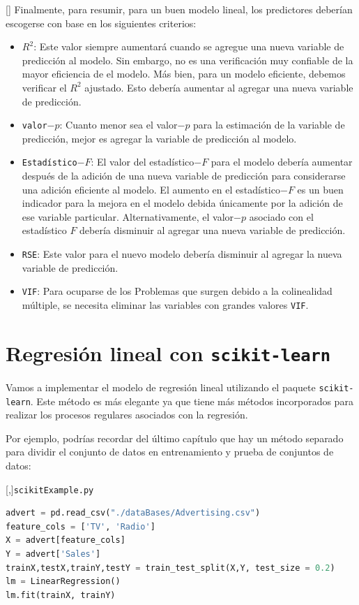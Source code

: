 []{}
Finalmente, para resumir, para un buen modelo lineal, los predictores deberían escogerse con base en los siguientes criterios:
\begin{itemize}
 \item \texttt{$R^2$}: Este valor siempre aumentará cuando se agregue una nueva variable de predicción al
modelo. Sin embargo, no es una verificación muy confiable de la mayor eficiencia de
el modelo. Más bien, para un modelo eficiente, debemos verificar el $R^2$ ajustado.
Esto debería aumentar al agregar una nueva variable de predicción.
\item \texttt{valor$-p$}: Cuanto menor sea el valor$-p$ para la estimación de la variable de predicción,
mejor es agregar la variable de predicción al modelo.
\item \texttt{Estadístico$-F$}: El valor del estadístico$-F$ para el modelo debería aumentar después de
la adición de una nueva variable de predicción para considerarse una
adición eficiente al modelo. El aumento en el estadístico$-F$ es un buen indicador para la mejora en el modelo debida únicamente por la adición de ese variable particular. Alternativamente, el valor$-p$ asociado con el estadístico $F$ debería disminuir al agregar una nueva variable de predicción. 
\item \texttt{RSE}: Este valor para el nuevo modelo debería disminuir al agregar
la nueva variable de predicción.
\item \texttt{VIF}: Para ocuparse de los Problemas que surgen debido a la colinealidad múltiple, se necesita
eliminar las variables con grandes valores \texttt{VIF}.
\end{itemize}


\section{Regresión lineal con \texttt{scikit-learn}}

Vamos a implementar el modelo de regresión lineal utilizando el paquete \texttt{scikit-learn}. Este método es más elegante ya que tiene más métodos incorporados para realizar
los procesos regulares asociados con la regresión.


Por ejemplo, podrías recordar
del último capítulo que hay un método separado para dividir el conjunto de datos en
entrenamiento y prueba de conjuntos de datos:

[,]{\texttt{scikitExample.py}}
\begin{lstlisting}[language=Python]
advert = pd.read_csv("./dataBases/Advertising.csv")
feature_cols = ['TV', 'Radio']
X = advert[feature_cols]
Y = advert['Sales']
trainX,testX,trainY,testY = train_test_split(X,Y, test_size = 0.2)
lm = LinearRegression()
lm.fit(trainX, trainY)
\end{lstlisting}

